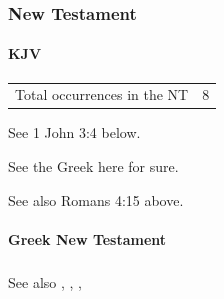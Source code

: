 		
	\subsubsection{New Testament} %
		\label{TRANSGRESSION-NT}
	
		\paragraph{KJV}
			\label{TRANSGRESSION-NT-KJV}
			
	
			\begin{tabular}{ll}
				Total occurrences in the NT & 8
			\end{tabular}
			
			\begin{compactdesc}
				\item[{\hyperref[ROMANS-4-15]{Romans 4:15}}] \phantom{.}
					\begin{compactitem}
						\item See 1 John 3:4 below.
					\end{compactitem} 
				\item[{\hyperref[1JOHN-3-4]{1 John 3:4}}] \phantom{.}
					\begin{compactitem}
						\item See the Greek here for sure.
						\item See also Romans 4:15 above.
					\end{compactitem}
			\end{compactdesc}
			
		\paragraph{Greek New Testament}
			\label{TRANSGRESSION-GREEK}
		
			\subparagraph{\texorpdfstring{}{}}
				\label{PARABASIS}
				
				See also \hyperref[HAMARTIA]{}, \hyperref[ANOMIA]{}, \hyperref[ADIKIA]{}, 
			
